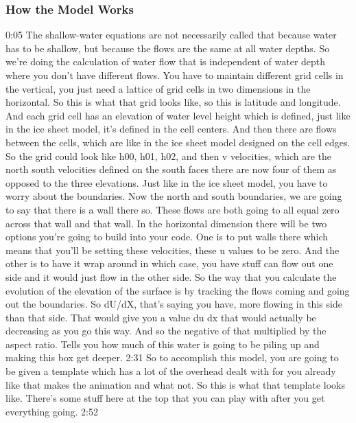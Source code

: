 {\subsubsection{How the Model Works}\index{}
0:05
The shallow-water equations are not necessarily called that because water has to be shallow, but because the flows are the same at all water depths. So we're doing the calculation of water flow that is independent of water depth where you don't have different flows. You have to maintain different grid cells in the vertical, you just need a lattice of grid cells in two dimensions in the horizontal. So this is what that grid looks like, so this is latitude and longitude. And each grid cell has an elevation of water level height which is defined, just like in the ice sheet model, it's defined in the cell centers. And then there are flows between the cells, which are like in the ice sheet model designed on the cell edges. So the grid could look like h00, h01, h02, and then v velocities, which are the north south velocities defined on the south faces there are now four of them as opposed to the three elevations. Just like in the ice sheet model, you have to worry about the boundaries. Now the north and south boundaries, we are going to say that there is a wall there so. These flows are both going to all equal zero across that wall and that wall. In the horizontal dimension there will be two options you're going to build into your code. One is to put walls there which means that you'll be setting these velocities, these u values to be zero. And the other is to have it wrap around in which case, you have stuff can flow out one side and it would just flow in the other side. So the way that you calculate the evolution of the elevation of the surface is by tracking the flows coming and going out the boundaries. So dU/dX, that's saying you have, more flowing in this side than that side. That would give you a value du dx that would actually be decreasing as you go this way. And so the negative of that multiplied by the aspect ratio. Tells you how much of this water is going to be piling up and making this box get deeper. 
2:31
So to accomplish this model, you are going to be given a template which has a lot of the overhead dealt with for you already like that makes the animation and what not. So this is what that template looks like. There's some stuff here at the top that you can play with after you get everything going. 
2:52
}
